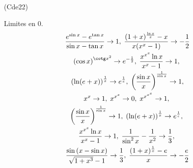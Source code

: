 \begin{tiny}(Cde22)\end{tiny} Limites en 0.
\begin{multline*}
  \frac{e^{\sin x}-e^{\tan x}}{\sin x-\tan x} \rightarrow  1,\;
 \frac{(1+x)^{\frac{\ln x}{x}}-x}{x(x^{x}-1)} \rightarrow  -\frac{1}{2}\\
 \left( \cos x\right) ^{\cotg x^{2}} \rightarrow  e^{-\frac{1}{2}},\;
 \frac{x^{x^{x}}\ln x}{x^{x}-1} \rightarrow  1,\; \\
 \left( \ln (e+x)\right) ^{\frac{1}{x}} \rightarrow  e^{\frac{1}{e}},\; 
 \left( \frac{\sin x}{x}\right)^{\frac{1}{\sin x}} \rightarrow  1, \\
 x^{x} \rightarrow  1,\;
 x^{x^{x}} \rightarrow  0,\;
 x^{x^{x^{x}}} \rightarrow  1,\;\\
\left( \frac{\sin x}{x}\right) ^{\frac{1}{\sin x}}\rightarrow 1 ,\;
\left( \ln (e+x)\right)^{\frac{1}{x}}\rightarrow e^{\frac{1}{e}} ,\; \\
\frac{x^{x^{x}}\ln x}{x^{x}-1}\rightarrow 1,\;
\frac{1}{\sin^2 x} - \frac{1}{x^2}\rightarrow \frac{1}{3},\; \\
\frac{\sin\left( x - \sin x\right) }{\sqrt{1+x^3} - 1} \rightarrow \frac{1}{3},\; 
\frac{(1+x)^{\frac{1}{x}} - e}{x} \rightarrow -\frac{e}{2}
\end{multline*}
